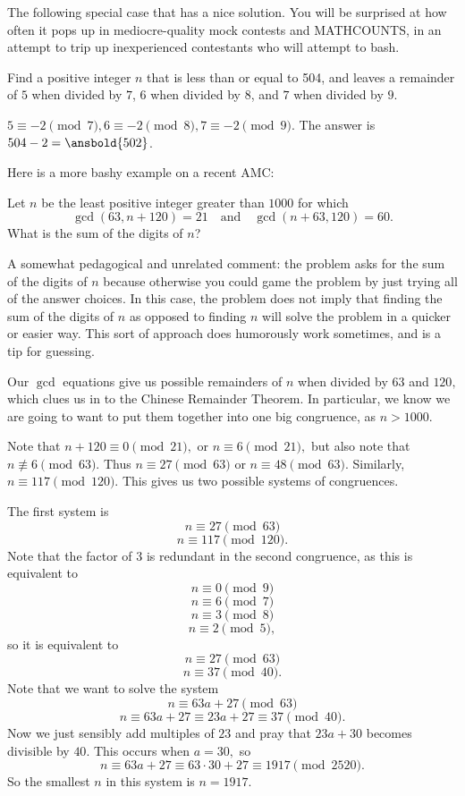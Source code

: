 \documentclass[mast]{lucky}
\begin{document}
The following special case that has a nice solution. You will be surprised at how often it pops up in mediocre-quality mock contests and MATHCOUNTS, in an attempt to trip up inexperienced contestants who will attempt to bash.
\begin{exam}
Find a positive integer $n$ that is less than or equal to 504, and leaves a remainder of $5$ when divided by $7$, $6$ when divided by $8$, and $7$ when divided by $9$.
\end{exam}
\begin{sol}
$5\equiv -2\pmod{7},6\equiv -2\pmod{8},7\equiv -2\pmod{9}$. The answer is $504-2=\ansbold{502}$.
\end{sol}

Here is a more bashy example on a recent AMC:
\begin{exam}[AMC 10A 2020/24]
Let $n$ be the least positive integer greater than $1000$ for which\[\gcd(63, n+120) =21\quad \text{and} \quad \gcd(n+63, 120)=60.\]What is the sum of the digits of $n$?
\end{exam}

A somewhat pedagogical and unrelated comment: the problem asks for the sum of the digits of $n$ because otherwise you could game the problem by just trying all of the answer choices. In this case, the problem does not imply that finding the sum of the digits of $n$ as opposed to finding $n$ will solve the problem in a quicker or easier way. This sort of approach does humorously work sometimes, and is a tip for guessing.

\begin{sol}
Our $\gcd$ equations give us possible remainders of $n$ when divided by $63$ and $120,$ which clues us in to the Chinese Remainder Theorem. In particular, we know we are going to want to put them together into one big congruence, as $n > 1000$.

Note that $n+120\equiv 0\pmod{21},$ or $n\equiv 6\pmod{21},$ but also note that $n\not\equiv 6\pmod{63}.$ Thus $n\equiv 27\pmod{63}$ or $n\equiv 48\pmod{63}.$ Similarly, $n\equiv 117\pmod{120}.$ This gives us two possible systems of congruences.

The first system is
\[n\equiv 27\pmod{63}\]
\[n\equiv 117\pmod{120}.\]
Note that the factor of $3$ is redundant in the second congruence, as this is equivalent to
\[n\equiv 0\pmod{9}\]
\[n\equiv 6\pmod{7}\]
\[n\equiv 3\pmod{8}\]
\[n\equiv 2\pmod{5},\]
so it is equivalent to
\[n\equiv 27\pmod{63}\]
\[n\equiv 37\pmod{40}.\]
Note that we want to solve the system
\[n\equiv 63a+27\pmod{63}\]
\[n\equiv 63a+27\equiv 23a+27\equiv 37\pmod{40}.\]
Now we just sensibly add multiples of $23$ and pray that $23a+30$ becomes divisible by $40.$ This occurs when $a=30,$ so
\[n\equiv 63a+27\equiv 63\cdot 30+27\equiv 1917\pmod{2520}.\]
So the smallest $n$ in this system is $n=1917.$
\end{sol}
\end{document}

